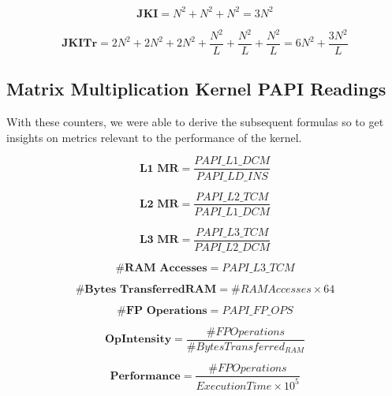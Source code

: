 \documentclass[twoside,twocolumn]{article}
\begin{document}
\begin{appendices}
\begin{equation} \label{eq:jki}
\textbf{JKI} = N^{2} + N^{2} + N^{2} = 3N^{2}
\end{equation}

\begin{equation} \label{eq:jkitr}
\textbf{JKITr} = 2N^{2} + 2N^{2} + 2N^{2} + \frac{N^{2}}{L} + \frac{N^{2}}{L} + \frac{N^{2}}{L} = 6N^{2} + \frac{3N^{2}}{L}
\end{equation}

\subsection{Matrix Multiplication Kernel PAPI Readings}
\label{ap:formulas}

With these counters, we were able to derive the subsequent formulas so to get insights on metrics relevant to the performance of the kernel.

\begin{equation} \label{eq:l1mr}
\textbf{L1 MR} = \frac{PAPI\_L1\_DCM}{PAPI\_LD\_INS} 
\end{equation}

\begin{equation} \label{eq:l2mr}
\textbf{L2 MR} = \frac{PAPI\_L2\_TCM}{PAPI\_L1\_DCM}
\end{equation}

\begin{equation} \label{eq:l3mr}
\textbf{L3 MR} = \frac{PAPI\_L3\_TCM}{PAPI\_L2\_DCM}
\end{equation}

\begin{equation} \label{eq:ramacc}
    \textbf{\#RAM Accesses} = PAPI\_L3\_TCM
\end{equation}

\begin{equation} \label{eq:rambytes}
\textbf{\#Bytes TransferredRAM} = \#RAM Accesses \times 64
\end{equation}

\begin{equation}
\textbf{\#FP Operations} = PAPI\_FP\_OPS
\end{equation}

\begin{equation}
    \textbf{OpIntensity} = \frac{\#FP Operations}{\#Bytes Transferred_{RAM}}
\end{equation}

\begin{equation}
    \textbf{Performance} = \frac{\#FP Operations}{ExecutionTime \times 10^{5}}
\end{equation}

\end{appendices}

\end{document}
